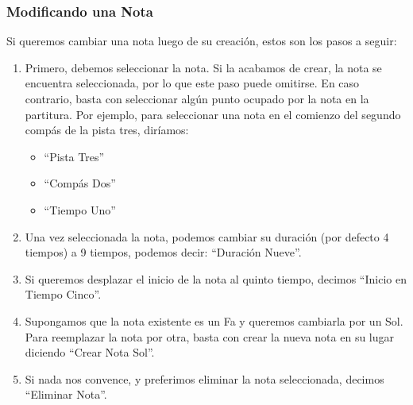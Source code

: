 \subsubsection{Modificando una Nota}

Si queremos cambiar una nota luego de su creaci\'on, estos son los pasos a seguir:

\begin{enumerate}
\item Primero, debemos seleccionar la nota. Si la acabamos de crear, la nota se 
    encuentra seleccionada, por lo que este paso puede omitirse.
    En caso contrario, basta con seleccionar alg\'un punto ocupado por la nota en la partitura.
    Por ejemplo, para seleccionar una nota en el comienzo del segundo comp\'as de la pista tres,  dir\'iamos:
    \begin{itemize}
        \item ``Pista Tres''
        \item ``Comp\'as Dos''
        \item ``Tiempo Uno''
    \end{itemize}
\item Una vez seleccionada la nota, podemos cambiar su duraci\'on (por defecto 4 tiempos) a 9 tiempos, podemos decir: 
    ``Duraci\'on Nueve''.
\item Si queremos desplazar el inicio de la nota al quinto tiempo, decimos ``Inicio en Tiempo Cinco''.
\item Supongamos que la nota existente es un Fa y queremos cambiarla por un Sol. Para reemplazar la 
    nota por otra, basta con crear la nueva nota en su lugar diciendo ``Crear Nota Sol''.
\item Si nada nos convence, y preferimos eliminar la nota seleccionada, decimos ``Eliminar Nota''.
\end{enumerate}